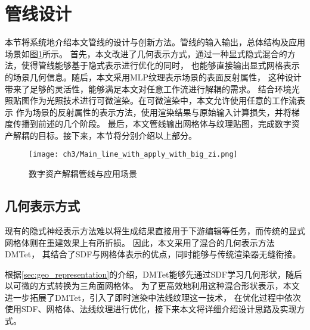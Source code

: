 \section{管线设计}
本节将系统地介绍本文管线的设计与创新方法。管线的输入输出，总体结构及应用场景如图\ref{fig:main_pipe_line}所示。
首先，本文改进了几何表示方式，通过一种显式隐式混合的方法，使得管线能够基于隐式表示进行优化的同时，
也能够直接输出显式网格表示的场景几何信息。随后，本文采用MLP纹理表示场景的表面反射属性，
这种设计带来了足够的灵活性，能够满足本文对任意工作流进行解耦的需求。
结合环境光照贴图作为光照技术进行可微渲染。在可微渲染中，本文允许使用任意的工作流表示
作为场景的反射属性的表示方法，使用渲染结果与原始输入计算损失，并将梯度传播到前述的几个阶段。
最后，本文管线输出网格体与纹理贴图，完成数字资产解耦的目标。接下来，本节将分别介绍以上部分。
\begin{figure}[htb]
  \centering
  \texttt{[image: ch3/Main\_line\_with\_apply\_with\_big\_zi.png]}
  \caption{数字资产解耦管线与应用场景}
  \label{fig:main_pipe_line}
\end{figure}
\subsection{几何表示方式}

现有的隐式神经表示方法难以将生成结果直接用于下游编辑等任务，而传统的显式网格体则在重建效果上有所折损。
因此，本文采用了混合的几何表示方法DMTet\cite{shen2021deep}，
其结合了SDF与网格体表示的优点，同时能够与传统渲染器无缝衔接。

根据\ref{sec:geo_representation}的介绍，DMTet能够先通过SDF学习几何形状，随后以可微的方式转换为三角面网格体。
为了更高效地利用这种混合形状表示，本文进一步拓展了DMTet，引入了即时渲染中法线纹理这一技术，
在优化过程中依次使用SDF、网格体、法线纹理进行优化，接下来本文将详细介绍设计思路及实现方式。

